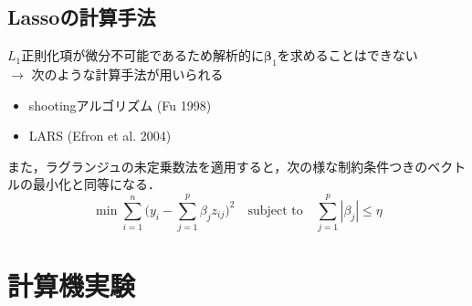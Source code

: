 \documentclass[dvipdfmx, 10pt]{beamer}
\begin{document}
\subsection{Lassoの計算手法}
\begin{frame}{\insertsubsection}
    $L_1$正則化項が微分不可能であるため解析的に$\bm{\beta}_1$を求めることはできない\\
    $\rightarrow$ 次のような計算手法が用いられる
    \begin{itemize}
	\item shootingアルゴリズム (Fu 1998)
       \item LARS (Efron et al. 2004)
    \end{itemize}
    \vspace{10pt}
    また，ラグランジュの未定乗数法を適用すると，次の様な制約条件つきのベクトルの最小化と同等になる．
    \begin{equation}
    	\min \sum_{i=1}^{n}\bigl(
    		 y_i - \sum_{j=1}^{p} \beta_j z_{ij}
    	\bigr)^2 \quad
    	\text{subject to} \quad \sum_{j=1}^{p} |\beta_j| \leq \eta
    \end{equation}

\end{frame}

\section{計算機実験}
\end{document}
